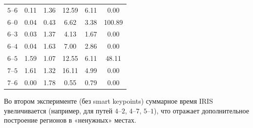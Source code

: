\documentclass[a4paper]{article}
\begin{document}
\begin{table}[htbp]
\begin{tabular}{c S[table-format=1.2] S[table-format=1.2] S[table-format=2.2] S[table-format=2.2] S[table-format=3.2]}
$5$--$6$   & 0.11 & 1.36 & 12.59 & 6.11 & 0.00 \\
$6$--$0$   & 0.04 & 0.43 & 6.62 & 3.38 & 100.89 \\
$6$--$3$   & 0.03 & 1.37 & 4.13 & 1.67 & 0.00 \\
$6$--$4$   & 0.04 & 1.63 & 7.00 & 2.86 & 0.00 \\
$6$--$5$   & 1.59 & 1.07 & 12.55 & 6.11 & 48.11 \\
$7$--$5$   & 1.61 & 1.32 & 16.11 & 4.99 & 0.00 \\
$7$--$6$   & 0.00 & 1.78 & 0.55 & 0.79 & 0.00 \\
\bottomrule
\end{tabular}
\end{table}

\medskip

Во втором эксперименте (без smart keypoints) суммарное время IRIS увеличивается (например, для путей $4$--$2$, $4$--$7$, $5$--$1$), что отражает дополнительное построение регионов в «ненужных» местах.
\end{document}
